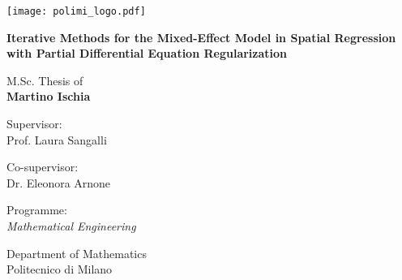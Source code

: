 
\newcommand{\myName}{Martino Ischia}
\newcommand{\myTitle}{Iterative Methods for the Mixed-Effect Model in Spatial Regression with Partial Differential Equation Regularization}
\newcommand{\myDegree}{Programme: \protect\\ \textit{Mathematical Engineering}}
\newcommand{\myDepartment}{Department of Mathematics}
\newcommand{\myUni}{Politecnico di Milano}
\newcommand{\myYear}{2021}
\newcommand{\myTime}{01 Sep \myYear}

\begin{titlepage}
	\texttt{[image: polimi\_logo.pdf]}
    \begin{addmargin}[3cm]{-1cm}
		\setlength{\parindent}{0pt}
		\vfill
		
		{
            \Huge\bfseries\myTitle 
            \par
        }
        
        \vspace{2cm}
        
        {\Large M.Sc. Thesis of\\[0.125cm]}
        {\LARGE\bfseries\myName}
        
        \vspace{1cm}
        
        \large
        Supervisor:\\[0.125cm]
        {\Large Prof. Laura Sangalli}
        
        \vspace{0.5cm}
        
        \large
        Co-supervisor:\\[0.125cm]
        {\Large Dr. Eleonora Arnone}
        
        \vspace{2cm}
        
       	\myDegree
	    	
	    \vspace{0.5cm}
	     
	    \myDepartment \\
	    \myUni
        
        \vfill
    \end{addmargin}
\end{titlepage}
